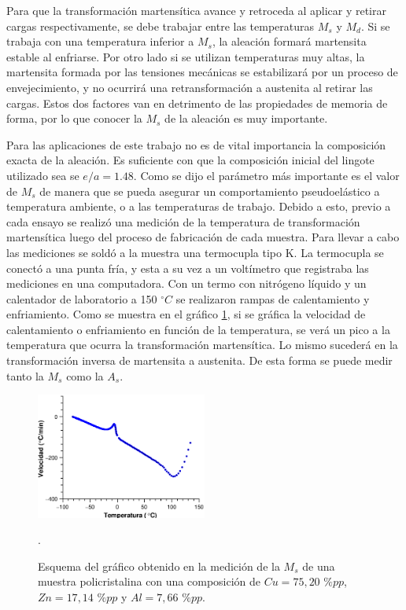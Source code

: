 \documentclass[a4paper,12pt,fleqn,twoside,openany]{book}
\begin{document}
Para que la transformación martensítica avance y retroceda al aplicar y retirar cargas respectivamente,  se debe trabajar entre las temperaturas $M_s$ y $M_d$. Si se trabaja con una temperatura inferior a $M_s$, la aleación formará martensita estable al enfriarse. Por otro lado si se utilizan temperaturas muy altas, la martensita formada  por las tensiones mecánicas se estabilizará por un proceso de envejecimiento, y no ocurrirá una retransformación a austenita al retirar las cargas. Estos dos factores van en detrimento de las propiedades de memoria de forma, por lo que conocer la $M_s$ de la aleación es muy importante.

Para las aplicaciones de este trabajo no es de vital importancia la composición exacta de la aleación. Es suficiente con que la composición inicial del lingote utilizado sea se $e/a=1.48$. Como se dijo el parámetro más importante es el valor de $M_s$ de manera que se pueda asegurar un comportamiento pseudoelástico a temperatura ambiente, o a las temperaturas de trabajo. Debido a esto, previo a cada ensayo se realizó una medición de la temperatura de transformación martensítica luego del proceso de fabricación de cada muestra.
Para llevar a cabo las mediciones se soldó a la muestra una termocupla tipo K. La termocupla se conectó a una punta fría, y esta a su vez a un voltímetro que registraba las mediciones en una computadora. Con un termo con nitrógeno líquido y un calentador de laboratorio a 150 $^\circ C$  se realizaron rampas de calentamiento y enfriamiento. 
Como se muestra en el gráfico \ref{fig:Ms}, si se gráfica la velocidad de calentamiento o enfriamiento en función de la temperatura, se verá un pico a la temperatura que ocurra la transformación martensítica. Lo mismo sucederá en la transformación inversa de martensita a austenita. De esta forma se puede medir tanto la $M_s$ como la $A_s$.



\begin{figure}
 \centering
 \includegraphics[width=0.5\textwidth]{Img/Procedimiento/Ms1.eps}
 \caption{Esquema del gráfico obtenido en la medición de la $M_s$ de una muestra  policristalina con una composición de $Cu=75,20$ $\%pp$, $Zn=17,14$ $\%pp$ y $Al=7,66$ $\%pp$.}. 
 \label{fig:Ms}
 \end{figure}
\end{document}
